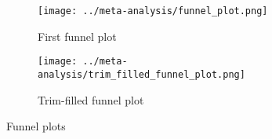 \begin{figure}[p]
\centering

\begin{subfigure}{0.4\textwidth}
\texttt{[image: ../meta-analysis/funnel\_plot.png]}
\caption{First funnel plot}
\label{fig:funnel_plot}
\end{subfigure}

\begin{subfigure}{0.4\textwidth}
\texttt{[image: ../meta-analysis/trim\_filled\_funnel\_plot.png]}
\caption{Trim-filled funnel plot}
\label{fig:trim_filled_funnel_plot}
\end{subfigure}

\caption[Funnel plots]{Funnel plots}

\label{fig:funnels}
\end{figure}
